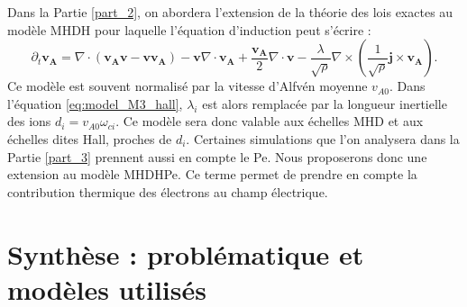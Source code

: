 Dans la Partie \ref{part_2}, on abordera l'extension de la théorie des lois exactes au modèle \acs{MHDH} pour laquelle l'équation d'induction peut s'écrire : 
\begin{equation}
\partial_t \boldsymbol{v_A}  =   \nabla \cdot \left(\boldsymbol{v_A}\boldsymbol{v} - \boldsymbol{v}\boldsymbol{v_A}\right) -  \boldsymbol{v}  \nabla \cdot \boldsymbol{v_A} +  \frac{\boldsymbol{v_A}}{2}  \nabla \cdot \boldsymbol{v} - \frac{\lambda}{ \sqrt{\rho} } \nabla \times\left(\frac{1}{\sqrt{\rho}} \boldsymbol{j}\times \boldsymbol{v_A}\right)  .\label{eq:model_M3_hall}
\end{equation}
Ce modèle est souvent normalisé par la vitesse d'Alfvén moyenne $v_{A0}$. Dans l'équation \eqref{eq:model_M3_hall}, $\lambda_i$ est alors remplacée par la longueur inertielle des ions $d_i = v_{A0}\omega_{ci}$. Ce modèle sera donc valable aux échelles MHD et aux échelles dites Hall, proches de $d_i$. Certaines simulations que l'on analysera dans la Partie \ref{part_3} prennent aussi en compte le \acl{Pe}. Nous proposerons donc une extension au modèle \acs{MHDHPe}. Ce terme permet de prendre en compte la contribution thermique des électrons au champ électrique.

\section{Synthèse : problématique et modèles utilisés}
\label{synt-02}

